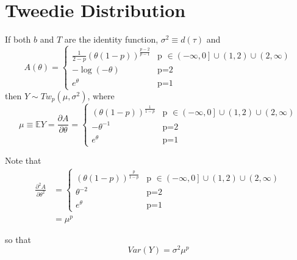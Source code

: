 \documentclass[11pt]{article}
\begin{document}
\section{Tweedie Distribution}
If both $b$ and $T$ are the identity function, $\sigma^2 \equiv d \left( \tau \right)$ and
\begin{equation}
A \left( \theta \right) = 
\begin{cases}
\frac{1}{2-p} \left( \theta \left( 1 - p \right) \right) ^ \frac{p-2}{p-1} &
     \text{p $\in \left( -\infty , 0 \right] \cup \left( 1 , 2 \right) \cup \left( 2 , \infty \right)$}\\
- \log \left( - \theta \right) & \text{p=2}\\
e^{\theta} & \text{p=1}
\end{cases}
\end{equation}
then $Y \sim Tw_p \left( \mu, \sigma^2 \right)$, where
\begin{equation}
\mu \equiv \mathbb{E} Y =
\frac{\partial A}{\partial \theta} = 
\begin{cases}
\left( \theta \left( 1 - p \right) \right)^{\frac{1}{1-p}} &
    \text{p $\in \left( -\infty , 0 \right] \cup \left( 1 , 2 \right) \cup \left( 2 , \infty \right)$}\\
- \theta^{-1} & \text{p=2}\\
e^{\theta} & \text{p=1}
\end{cases}
\end{equation}

Note that
\begin{equation}
\begin{split}
\frac{\partial^2 A}{\partial \theta^2} & = 
\begin{cases}
\left( \theta \left( 1 - p \right) \right)^{\frac{p}{1-p}} &
  \text{p $\in \left( -\infty , 0 \right] \cup \left( 1 , 2 \right) \cup \left( 2 , \infty \right)$}\\
\theta^{-2} & \text{p=2}\\
e^{\theta} & \text{p=1}
\end{cases} \\
& = \mu^p
\end{split}
\end{equation}

so that
\begin{equation}
Var \left( Y \right) = \sigma^2 \mu^p
\end{equation}
\end{document}
